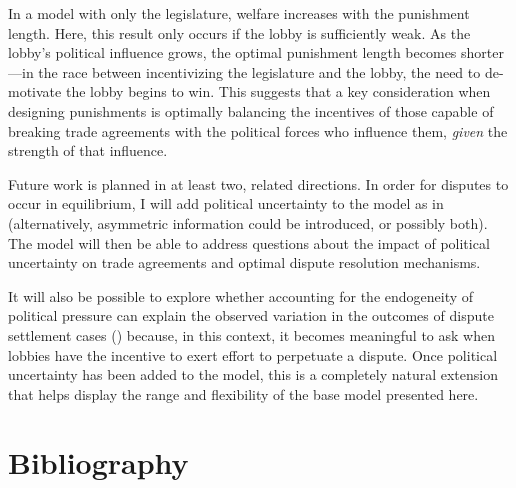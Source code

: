 \documentclass[authoryear, review]{elsarticle}
\begin{document}
In a model with only the legislature, welfare increases with the punishment length. Here, this result only occurs if the lobby is sufficiently weak. As the lobby's political influence grows, the optimal punishment length becomes shorter---in the race between incentivizing the legislature and the lobby, the need to de-motivate the lobby begins to win. This suggests that a key consideration when designing punishments is optimally balancing the incentives of those capable of breaking trade agreements with the political forces who influence them, \textit{given} the strength of that influence.

Future work is planned in at least two, related directions. In order for disputes to occur in equilibrium, I will add political uncertainty to the model as in \citet{buzard2013b} (alternatively, asymmetric information could be introduced, or possibly both). The model will then be able to address questions about the impact of political uncertainty on trade agreements and optimal dispute resolution mechanisms.

It will also be possible to explore whether accounting for the endogeneity of political pressure can explain the observed variation in the outcomes of dispute settlement cases (\citet{buschrein}) because, in this context, it becomes meaningful to ask when lobbies have the incentive to exert effort to perpetuate a dispute. Once political uncertainty has been added to the model, this is a completely natural extension that helps display the range and flexibility of the base model presented here.


\section{Bibliography}

%


\newpage
\appendix
\end{document}
